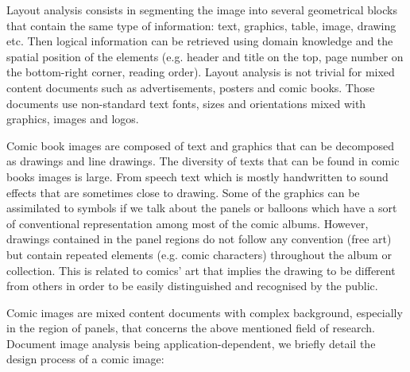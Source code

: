 Layout analysis consists in segmenting the image into several geometrical blocks that contain the same type of information: text, graphics, table, image, drawing etc.
Then logical information can be retrieved using domain knowledge and the spatial position of the elements (e.g. header and title on the top, page number on the bottom-right corner, reading order).
Layout analysis is not trivial for mixed content documents such as advertisements, posters and comic books.
Those documents use non-standard text fonts, sizes and orientations mixed with graphics, images and logos.%


Comic book images are composed of text and graphics that can be decomposed as drawings and line drawings.
The diversity of texts that can be found in comic books images is large.
From speech text which is mostly handwritten to sound effects that are sometimes close to drawing.
Some of the graphics can be assimilated to symbols if we talk about the panels or balloons which have a sort of conventional representation among most of the comic albums.
However, drawings contained in the panel regions do not follow any convention (free art) but contain repeated elements (e.g. comic characters) throughout the album or collection.
This is related to comics' art that implies the drawing to be different from others in order to be easily distinguished and recognised by the public.

Comic images are mixed content documents with complex background, especially in the region of panels, that concerns the above mentioned field of research.
Document image analysis being application-dependent, we briefly detail the design process of a comic image:


